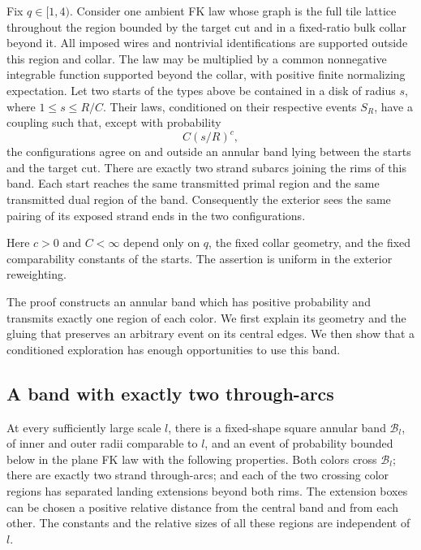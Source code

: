 \begin{proposition}
\label{prop:outward}
Fix $q\in[1,4)$.  Consider one ambient FK law whose graph is the full
tile lattice throughout the region bounded by the target cut and in
a fixed-ratio bulk collar beyond it.  All imposed wires and
nontrivial identifications are supported outside this region and
collar.  The law may be multiplied by a common
nonnegative integrable function supported beyond the collar, with
positive finite normalizing expectation.  Let two starts of the types
above be contained in a disk of radius $s$, where $1\le s\le R/C$.
Their laws, conditioned on their respective events $S_R$, have a
coupling such that, except with probability
\begin{equation}\label{eq:outward-error}
 C(s/R)^c,
\end{equation}
the configurations agree on and outside an annular band lying between
the starts and the target cut.  There are exactly two strand subarcs
joining the rims of this band.  Each start reaches the same
transmitted primal region and the same transmitted dual region of
the band.  Consequently the exterior sees the same pairing of its
exposed strand ends in the two configurations.

Here $c>0$ and $C<\infty$ depend only on $q$, the fixed collar
geometry, and the fixed comparability constants of the starts.  The
assertion is uniform in the exterior reweighting.
\end{proposition}

The proof constructs an annular band which has positive probability
and transmits exactly one region of each color.  We first explain its
geometry and the gluing that preserves an arbitrary event on its
central edges.  We then show that a conditioned exploration has enough
opportunities to use this band.

\subsection{A band with exactly two through-arcs}

\begin{lemma}
\label{lem:reference-band}
At every sufficiently large scale $l$, there is a fixed-shape square
annular band $\mathcal B_l$, of inner and outer radii comparable to
$l$, and an event of probability bounded below in the plane FK law
with the following properties.  Both colors cross $\mathcal B_l$;
there are exactly two strand through-arcs; and each of the two
crossing color regions has separated landing extensions beyond both
rims.  The extension boxes can be chosen a positive relative distance
from the central band and from each other.  The constants and the
relative sizes of all these regions are independent of $l$.
\end{lemma}

